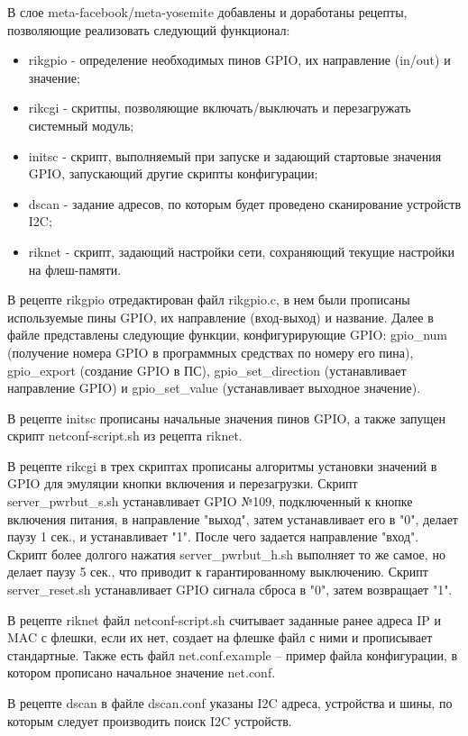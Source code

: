 В слое meta-facebook/meta-yosemite добавлены и доработаны рецепты, позволяющие реализовать следующий функционал:
\begin{itemize}
	\item rikgpio - определение необходимых пинов GPIO, их направление (in/out) и значение;
	\item rikcgi - скритпы, позволяющие включать/выключать и перезагружать системный модуль;
	\item initsc - скрипт, выполняемый при запуске и задающий стартовые значения GPIO, запускающий другие скрипты конфигурации;
	\item dscan - задание адресов, по которым будет проведено сканирование устройств I2C;
	\item riknet - скрипт, задающий настройки сети, сохраняющий текущие настройки на флеш-памяти.
\end{itemize}

В рецепте rikgpio отредактирован файл rikgpio.c, в нем были прописаны используемые пины GPIO, их направление (вход-выход) и название. Далее в файле представлены следующие функции, конфигурирующие GPIO: gpio\_num (получение номера GPIO в программных средствах по номеру его пина), gpio\_export (создание GPIO в ПС), gpio\_set\_direction (устанавливает направление GPIO) и gpio\_set\_value (устанавливает выходное значение).

В рецепте initsc прописаны начальные значения пинов GPIO, а также запущен скрипт netconf-script.sh из рецепта riknet. 

В рецепте rikcgi в трех скриптах прописаны алгоритмы установки значений в GPIO для эмуляции кнопки включения и перезагрузки. Скрипт server\_pwrbut\_s.sh устанавливает GPIO №109, подключенный к кнопке включения питания, в направление "выход", затем устанавливает его в "0", делает паузу 1 сек., и устанавливает "1". После чего задается направление "вход". Скрипт более долгого нажатия server\_pwrbut\_h.sh выполняет то же самое, но делает паузу 5 сек., что приводит к гарантированному выключению. Скрипт server\_reset.sh устанавливает GPIO сигнала сброса в "0", затем возвращает "1".

В рецепте riknet файл netconf-script.sh считывает заданные ранее адреса IP и MAC с флешки, если их нет, создает на флешке файл с ними и прописывает стандартные. Также есть файл net.conf.example -- пример файла конфигурации, в котором прописано начальное значение net.conf.

В рецепте dscan в файле dscan.conf указаны I2C адреса, устройства и шины, по которым следует производить поиск I2C устройств.

